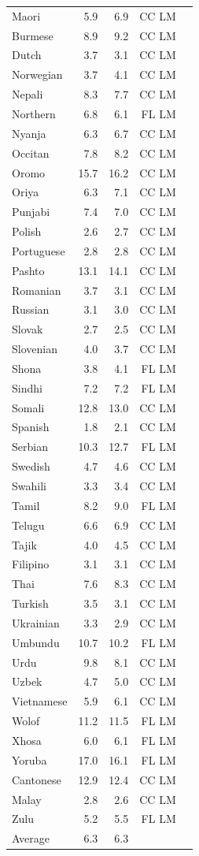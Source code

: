 {\begin{table}[h!]
\begin{small}
\begin{minipage}[t]{0.49\textwidth}
\begin{tabular}{lrrrr}
Maori & 5.9 & 6.9 & CC LM \\
Burmese & 8.9 & 9.2 & CC LM \\
Dutch & 3.7 & 3.1 & CC LM \\
Norwegian & 3.7 & 4.1 & CC LM \\
Nepali & 8.3 & 7.7 & CC LM \\
Northern & 6.8 & 6.1 & FL LM \\
Nyanja & 6.3 & 6.7 & CC LM \\
Occitan & 7.8 & 8.2 & CC LM \\
Oromo & 15.7 & 16.2 & CC LM \\
Oriya & 6.3 & 7.1 & CC LM \\
Punjabi & 7.4 & 7.0 & CC LM \\
Polish & 2.6 & 2.7 & CC LM \\
Portuguese & 2.8 & 2.8 & CC LM \\
Pashto & 13.1 & 14.1 & CC LM \\
Romanian & 3.7 & 3.1 & CC LM \\
Russian & 3.1 & 3.0 & CC LM \\
Slovak & 2.7 & 2.5 & CC LM \\
Slovenian & 4.0 & 3.7 & CC LM \\
Shona & 3.8 & 4.1 & FL LM \\
Sindhi & 7.2 & 7.2 & FL LM \\
Somali & 12.8 & 13.0 & CC LM \\
Spanish & 1.8 & 2.1 & CC LM \\
Serbian & 10.3 & 12.7 & FL LM \\
Swedish & 4.7 & 4.6 & CC LM \\
Swahili & 3.3 & 3.4 & CC LM \\
Tamil & 8.2 & 9.0 & FL LM \\
Telugu & 6.6 & 6.9 & CC LM \\
Tajik & 4.0 & 4.5 & CC LM \\
Filipino & 3.1 & 3.1 & CC LM \\
Thai & 7.6 & 8.3 & CC LM \\
Turkish & 3.5 & 3.1 & CC LM \\
Ukrainian & 3.3 & 2.9 & CC LM \\
Umbundu & 10.7 & 10.2 & FL LM \\
Urdu & 9.8 & 8.1 & CC LM \\
Uzbek & 4.7 & 5.0 & CC LM \\
Vietnamese & 5.9 & 6.1 & CC LM \\
Wolof & 11.2 & 11.5 & FL LM \\
Xhosa & 6.0 & 6.1 & FL LM \\
Yoruba & 17.0 & 16.1 & FL LM \\
Cantonese & 12.9 & 12.4 & CC LM \\
Malay & 2.8 & 2.6 & CC LM \\
Zulu & 5.2 & 5.5 & FL LM \\
\midrule 
Average & 6.3 & 6.3 \\
\bottomrule


\end{tabular}
\end{minipage}
\end{small}
\end{table}}
